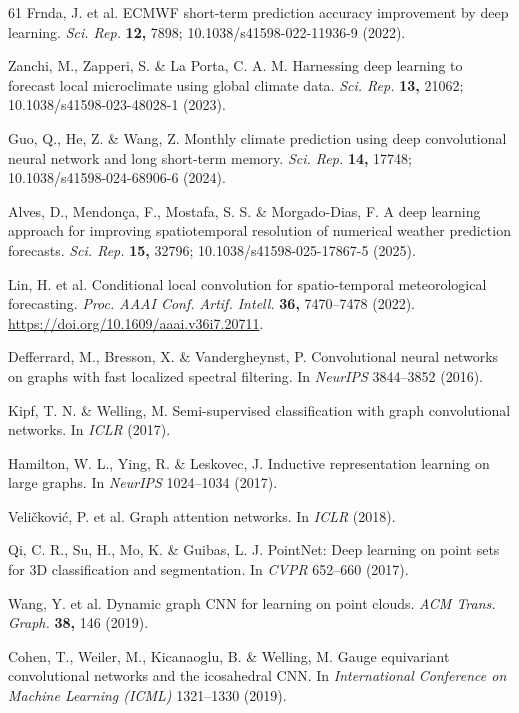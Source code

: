 \documentclass[fleqn,10pt]{wlscirep}
\begin{document}
\begin{thebibliography}{61}
Frnda, J. et al. ECMWF short-term prediction accuracy improvement by deep
  learning. \textit{Sci. Rep.} \textbf{12,} 7898; 10.1038/s41598-022-11936-9
  (2022).

Zanchi, M., Zapperi, S. \& La Porta, C. A. M. Harnessing deep learning to
  forecast local microclimate using global climate data. \textit{Sci. Rep.}
  \textbf{13,} 21062; 10.1038/s41598-023-48028-1 (2023).

Guo, Q., He, Z. \& Wang, Z. Monthly climate prediction using deep
  convolutional neural network and long short-term memory.
  \textit{Sci. Rep.} \textbf{14,} 17748; 10.1038/s41598-024-68906-6 (2024).

Alves, D., Mendon\c{c}a, F., Mostafa, S. S. \& Morgado-Dias, F. A deep
  learning approach for improving spatiotemporal resolution of numerical
  weather prediction forecasts. \textit{Sci. Rep.} \textbf{15,} 32796;
  10.1038/s41598-025-17867-5 (2025).

Lin, H. et al. Conditional local convolution for spatio-temporal
  meteorological forecasting. \textit{Proc. AAAI Conf. Artif. Intell.}
  \textbf{36,} 7470--7478 (2022). \url{https://doi.org/10.1609/aaai.v36i7.20711}.

Defferrard, M., Bresson, X. \& Vandergheynst, P. Convolutional neural
  networks on graphs with fast localized spectral filtering. In
  \textit{NeurIPS} 3844--3852 (2016).

Kipf, T. N. \& Welling, M. Semi-supervised classification with graph
  convolutional networks. In \textit{ICLR} (2017).

Hamilton, W. L., Ying, R. \& Leskovec, J. Inductive representation
  learning on large graphs. In \textit{NeurIPS} 1024--1034 (2017).

Veli\v{c}kovi\'c, P. et al. Graph attention networks. In \textit{ICLR}
  (2018).

Qi, C. R., Su, H., Mo, K. \& Guibas, L. J. PointNet: Deep learning on
  point sets for 3D classification and segmentation. In \textit{CVPR}
  652--660 (2017).

Wang, Y. et al. Dynamic graph CNN for learning on point clouds.
  \textit{ACM Trans. Graph.} \textbf{38,} 146 (2019).

Cohen, T., Weiler, M., Kicanaoglu, B. \& Welling, M. Gauge equivariant
convolutional networks and the icosahedral CNN. In \textit{International
Conference on Machine Learning (ICML)} 1321--1330 (2019).


\end{thebibliography}
\end{document}
